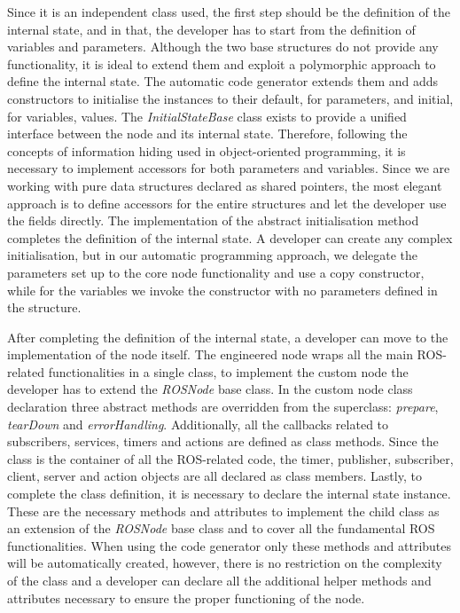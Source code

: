 Since it is an independent class used, the first step should be the definition of the internal state, and in that, the developer has to start from the definition of variables and parameters. Although the two base structures do not provide any functionality, it is ideal to extend them and exploit a polymorphic approach to define the internal state. The automatic code generator extends them and adds constructors to initialise the instances to their default, for parameters, and initial, for variables, values. The \textit{InitialStateBase} class exists to provide a unified interface between the node and its internal state. Therefore, following the concepts of information hiding used in object-oriented programming, it is necessary to implement accessors for both parameters and variables. Since we are working with pure data structures declared as shared pointers, the most elegant approach is to define accessors for the entire structures and let the developer use the fields directly. The implementation of the abstract initialisation method completes the definition of the internal state. A developer can create any complex initialisation, but in our automatic programming approach, we delegate the parameters set up to the core node functionality and use a copy constructor, while for the variables we invoke the constructor with no parameters defined in the structure.

After completing the definition of the internal state, a developer can move to the implementation of the node itself. The engineered node wraps all the main ROS-related functionalities in a single class, to implement the custom node the developer has to extend the \textit{ROSNode} base class. In the custom node class declaration three abstract methods are overridden from the superclass: \textit{prepare}, \textit{tearDown} and \textit{errorHandling}. Additionally, all the callbacks related to subscribers, services, timers and actions are defined as class methods. Since the class is the container of all the ROS-related code, the timer, publisher, subscriber, client, server and action objects are all declared as class members. Lastly, to complete the class definition, it is necessary to declare the internal state instance. These are the necessary methods and attributes to implement the child class as an extension of the \textit{ROSNode} base class and to cover all the fundamental ROS functionalities. When using the code generator only these methods and attributes will be automatically created, however, there is no restriction on the complexity of the class and a developer can declare all the additional helper methods and attributes necessary to ensure the proper functioning of the node.

